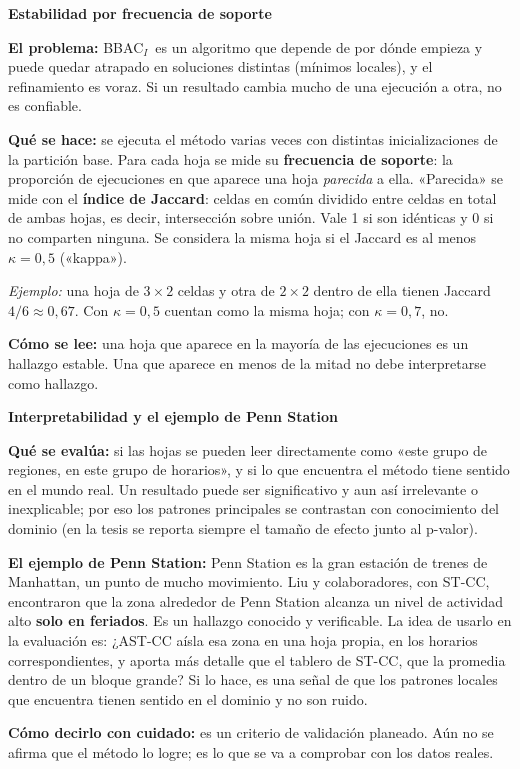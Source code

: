 \documentclass[11pt,a4paper]{article}
\newcommand{\cajainicio}[3]{\par\medskip\noindent
  \begin{lrbox}{\cajabox}\begin{minipage}{\dimexpr\linewidth-2\fboxsep-2\fboxrule\relax}%
  \textbf{\color{#1}#3}\par\smallskip}
\newcommand{\cajafin}[2]{\end{minipage}\end{lrbox}\fcolorbox{#1}{#2}{\usebox{\cajabox}}\par\medskip}
\newenvironment{nota}[1]{\cajainicio{acc}{acc!7}{#1}}{\cajafin{acc}{acc!7}}
\newcommand{\STCC}{ST-CC}
\newcommand{\BBAC}{BBAC$_I$}
\begin{document}
\begin{nota}{Estabilidad por frecuencia de soporte}
\textbf{El problema:} \BBAC\ es un algoritmo que depende de por dónde empieza y puede quedar atrapado en soluciones distintas (mínimos locales), y el refinamiento es voraz. Si un resultado cambia mucho de una ejecución a otra, no es confiable.

\textbf{Qué se hace:} se ejecuta el método varias veces con distintas inicializaciones de la partición base. Para cada hoja se mide su \textbf{frecuencia de soporte}: la proporción de ejecuciones en que aparece una hoja \emph{parecida} a ella. «Parecida» se mide con el \textbf{índice de Jaccard}: celdas en común dividido entre celdas en total de ambas hojas, es decir, intersección sobre unión. Vale 1 si son idénticas y 0 si no comparten ninguna. Se considera la misma hoja si el Jaccard es al menos $\kappa=0{,}5$ («kappa»).

\textit{Ejemplo:} una hoja de $3\times2$ celdas y otra de $2\times2$ dentro de ella tienen Jaccard $4/6\approx0{,}67$. Con $\kappa=0{,}5$ cuentan como la misma hoja; con $\kappa=0{,}7$, no.

\textbf{Cómo se lee:} una hoja que aparece en la mayoría de las ejecuciones es un hallazgo estable. Una que aparece en menos de la mitad no debe interpretarse como hallazgo.
\end{nota}

\begin{nota}{Interpretabilidad y el ejemplo de Penn Station}
\textbf{Qué se evalúa:} si las hojas se pueden leer directamente como «este grupo de regiones, en este grupo de horarios», y si lo que encuentra el método tiene sentido en el mundo real. Un resultado puede ser significativo y aun así irrelevante o inexplicable; por eso los patrones principales se contrastan con conocimiento del dominio (en la tesis se reporta siempre el tamaño de efecto junto al p-valor).

\textbf{El ejemplo de Penn Station:} Penn Station es la gran estación de trenes de Manhattan, un punto de mucho movimiento. Liu y colaboradores, con \STCC, encontraron que la zona alrededor de Penn Station alcanza un nivel de actividad alto \textbf{solo en feriados}. Es un hallazgo conocido y verificable. La idea de usarlo en la evaluación es: ¿AST-CC aísla esa zona en una hoja propia, en los horarios correspondientes, y aporta más detalle que el tablero de \STCC, que la promedia dentro de un bloque grande? Si lo hace, es una señal de que los patrones locales que encuentra tienen sentido en el dominio y no son ruido.

\textbf{Cómo decirlo con cuidado:} es un criterio de validación planeado. Aún no se afirma que el método lo logre; es lo que se va a comprobar con los datos reales.
\end{nota}
\end{document}

